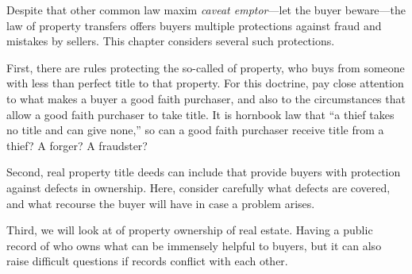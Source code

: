 

\endedit

Despite that other common law maxim \emph{caveat emptor}---let the buyer
beware---the law of property transfers offers buyers multiple protections
against fraud and mistakes by sellers. This chapter considers several such
protections.

First, there are rules protecting the so-called  of property, who buys from someone with less than perfect title to that
property. For this doctrine, pay close attention to what makes a buyer a good
faith purchaser, and also to the circumstances that allow a good faith purchaser
to take title. It is hornbook law that ``a thief takes no title and can give
none,'' so can a good faith purchaser receive title from a thief? A forger? A
fraudster?

Second, real property title deeds can include  that
provide buyers with protection against defects in ownership. Here, consider
carefully what defects are covered, and what recourse the buyer will have in
case a problem arises.

Third, we will look at  of property ownership of real estate.
Having a public record of who owns what can be immensely helpful to buyers, but
it can also raise difficult questions if records conflict with each other.


